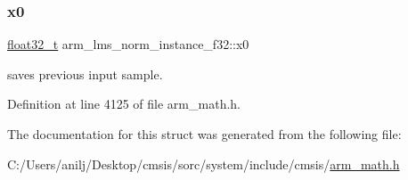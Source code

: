 \mbox{\label{structarm__lms__norm__instance__f32_aec958fe89b164a30f38bcca9f5d96218}} 
\subsubsection{\texorpdfstring{x0}{x0}}
{\footnotesize\ttfamily \hyperlink{arm__math_8h_a4611b605e45ab401f02cab15c5e38715}{float32\+\_\+t} arm\+\_\+lms\+\_\+norm\+\_\+instance\+\_\+f32\+::x0}

saves previous input sample. 

Definition at line 4125 of file arm\+\_\+math.\+h.



The documentation for this struct was generated from the following file\+:\begin{DoxyCompactItemize}
\item 
C\+:/\+Users/anilj/\+Desktop/cmsis/sorc/system/include/cmsis/\hyperlink{arm__math_8h}{arm\+\_\+math.\+h}\end{DoxyCompactItemize}
